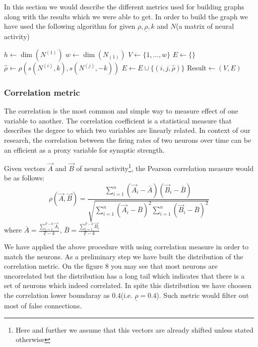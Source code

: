 \documentclass{article}
\begin{document}
	In this section we would describe the different metrics used for building graphs along with the results which we
	were able to get.
	In order to build the graph we have used the following algorithm for given $\rho,\underline{\rho}, k$ and $N$(a matrix of neural activity)
	\begin{algorithmic}[1]
	\State $h \leftarrow \dim(N^{(1)})$ 
	\State $w \leftarrow \dim(N_{(1)})$ 
	\State $V \leftarrow \{1,\dots,w\}$
	\State $E \leftarrow \{\}$
	         \State $\hat{\rho}\leftarrow\rho(s(N^{(i)}, k), s(N^{(j)}, -k))$
	         \If{$\hat{\rho} \geq \underline{\rho}$}
	             \State $E\leftarrow E\cup \{(i,j,\hat{\rho})\}$
	         \EndIf
	    \EndFor
	\EndFor
	\State Result$\leftarrow (V, E)$
	\EndFunction
	\end{algorithmic}

	\subsubsection{Correlation metric}

	The correlation is the most common and simple way to measure effect of one variable to another.
	The correlation coefficient is a statistical measure that describes the degree to which two variables are linearly related.
	In context of our research, the correlation between the firing rates of two neurons over time can be an efficient
	as a proxy variable for synaptic strength.

	Given vectors $\vec{A}$ and $\vec{B}$ of neural activity\footnote{Here and further we assume that this vectors are
	already shifted unless stated otherwise}, the Pearson correlation measure would be as follows:
	\[
		\rho(\vec A, \vec B) = \frac{
			\sum_{i=1}^{n} (\vec A_i-\bar{A})(\vec B_i-\bar{B})
		} {
			\sqrt{\sum_{i=1}^{n} (\vec A_i-\bar{B})^2 \sum_{i=1}^{n} (\vec B_i-\bar{B})^2}
		}
	\]
	where $\bar{A} = \frac{\sum_{i=1}^{T-k} \vec{A}_i}{T-k}$, $\bar{B} = \frac{\sum_{i=1}^{T-k} \vec{B}_i}{T-k}$

	We have applied the above procedure with using correlation measure in order to match the neurons.
	As a preliminary step we have built the distribution of the correlation metric.
	On the figure 8 you may see that most neurons are uncorrelated but the distribution
	has a long tail which indicates that there is a set of neurons which indeed correlated. In spite
	this distribution we have choosen the correlation lower boundaray as $0.4$(i.e. $\underline{\rho}=0.4$).
	Such metric would filter out most of false connections.
\end{document}
